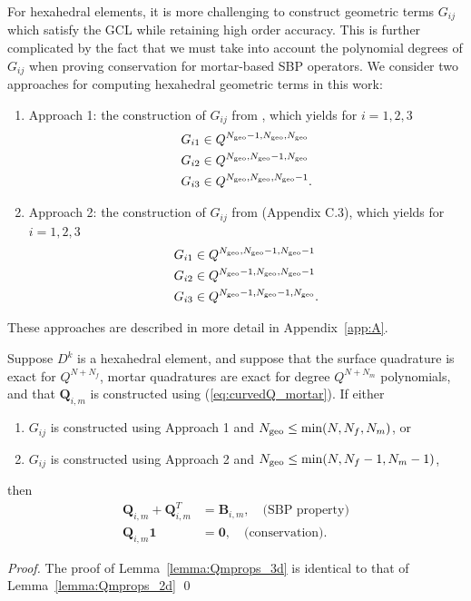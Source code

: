 \documentclass{svjour3}                     %
\renewcommand{\note}[1]{{\color{blue}{#1}}}
\begin{document}
For hexahedral elements, it is more challenging to construct geometric terms $G_{ij}$ which satisfy the GCL while retaining high order accuracy.  This is further complicated by the fact that we must take into account the polynomial degrees of $G_{ij}$ when proving conservation for mortar-based SBP operators.  We consider two approaches for computing hexahedral geometric terms in this work:
\begin{enumerate}
\item Approach 1: the construction of $G_{ij}$ from \cite{kopriva2006metric, chan2018efficient}, which yields for $i = 1,2,3$
\begin{align*}
&G_{i1} \in Q^{N_{\rm geo}-1,N_{\rm geo},N_{\rm geo}}\\
&G_{i2} \in Q^{N_{\rm geo},N_{\rm geo}-1,N_{\rm geo}}\\
&G_{i3} \in Q^{N_{\rm geo},N_{\rm geo},N_{\rm geo}-1}.
\end{align*}
\item Approach 2: the construction of $G_{ij}$ from \cite{kozdon2018energy} (Appendix C.3), which yields for $i = 1,2,3$
\begin{align*}
&G_{i1} \in Q^{N_{\rm geo},N_{\rm geo}-1,N_{\rm geo}-1}\\
&G_{i2} \in Q^{N_{\rm geo}-1,N_{\rm geo},N_{\rm geo}-1}\\
&G_{i3} \in Q^{N_{\rm geo}-1,N_{\rm geo}-1,N_{\rm geo}}.
\end{align*}
\end{enumerate}
These approaches are described in more detail in Appendix~\ref{app:A}.  
\begin{lemma}
\label{lemma:Qmprops_3d}
Suppose $D^k$ is a hexahedral element, and suppose that the surface quadrature is exact for $Q^{N+N_f}$, mortar quadratures are exact for degree $Q^{N+N_m}$ polynomials, and that $\bm{Q}_{i,m}$ is constructed using (\ref{eq:curvedQ_mortar}).  If either
\begin{enumerate}
\item $G_{ij}$ is constructed using Approach 1 \cite{kopriva2006metric, chan2018efficient} and $N_{\rm geo} \leq \min(N,N_f,N_m)$, or
\item $G_{ij}$ is constructed using Approach 2 \cite{kozdon2018energy} and $N_{\rm geo} \leq \min(N,N_f-1,N_m-1)$, 
\end{enumerate}
then 
\begin{align*}
\bm{Q}_{i,m} + \bm{Q}_{i,m}^T &= \bm{B}_{i,m}, \quad \text{(SBP property)}\\
\bm{Q}_{i,m}\bm{1} &= \bm{0}, \quad \text{(conservation)}.
\end{align*}
\end{lemma}
\begin{proof}
\note{Finish} The proof of Lemma~\ref{lemma:Qmprops_3d} is identical to that of Lemma~\ref{lemma:Qmprops_2d}
\qed\end{proof}
\end{document}

